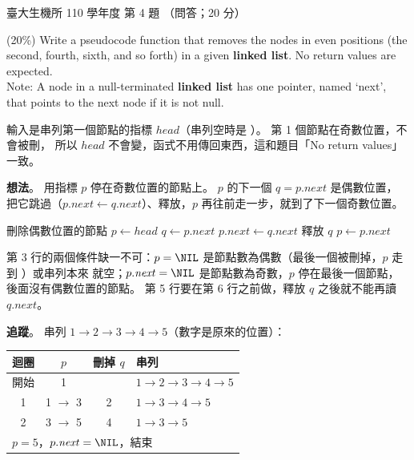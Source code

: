 \begin{pastexam}[label={px:ntu-110-bime-ds-04}]{臺大生機所 110 學年度 第 4 題}
（問答；20 分）

(20\%) Write a pseudocode function that removes the nodes in even positions (the second, fourth, sixth,
and so forth) in a given \textbf{linked list}. No return values are expected.\\
Note: A node in a null-terminated \textbf{linked list} has one pointer, named `next', that points to the
next node if it is not null.
\end{pastexam}

\begin{pastsoln}
輸入是串列第一個節點的指標 $\mathit{head}$（串列空時是 \NIL）。 第 1 個節點在奇數位置，不會被刪，
所以 $\mathit{head}$ 不會變，函式不用傳回東西，這和題目「No return values」一致。

\textbf{想法}。 用指標 $p$ 停在奇數位置的節點上。 $p$ 的下一個 $q = p.\mathit{next}$ 是偶數位置，
把它跳過（$p.\mathit{next} \gets q.\mathit{next}$）、釋放，$p$ 再往前走一步，就到了下一個奇數位置。

\begin{pseudo}{刪除偶數位置的節點}
    \State $p \gets \mathit{head}$
        \State $q \gets p.\mathit{next}$ 
        \State $p.\mathit{next} \gets q.\mathit{next}$ 
        \State 釋放 $q$
        \State $p \gets p.\mathit{next}$ 
    \EndWhile
\EndProcedure
\end{pseudo}

第 3 行的兩個條件缺一不可：$p = \NIL$ 是節點數為偶數（最後一個被刪掉，$p$ 走到 \NIL）或串列本來
就空；$p.\mathit{next} = \NIL$ 是節點數為奇數，$p$ 停在最後一個節點，後面沒有偶數位置的節點。
第 5 行要在第 6 行之前做，釋放 $q$ 之後就不能再讀 $q.\mathit{next}$。

\textbf{追蹤}。 串列 $1 \to 2 \to 3 \to 4 \to 5$（數字是原來的位置）：
\begin{center}
\begin{tabular}{cccl}
\toprule
迴圈 & $p$ & 刪掉 $q$ & 串列 \\
\midrule
開始 & 1 & & $1 \to 2 \to 3 \to 4 \to 5$ \\
1 & 1 $\to$ 3 & 2 & $1 \to 3 \to 4 \to 5$ \\
2 & 3 $\to$ 5 & 4 & $1 \to 3 \to 5$ \\
\multicolumn{4}{l}{$p = 5$，$p.\mathit{next} = \NIL$，結束} \\
\bottomrule
\end{tabular}
\end{center}


\end{pastsoln}

